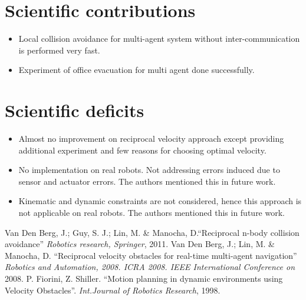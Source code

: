 \documentclass[12pt]{article}
\begin{document}
\section{Scientific contributions}
\begin{itemize}
    \item Local collision avoidance for multi-agent system without inter-communication is performed very fast.
    \item Experiment of office evacuation for multi agent done successfully.
\end{itemize}

\section{Scientific deficits}
\begin{itemize}
    \item Almost no improvement on reciprocal velocity approach\cite{van2008reciprocal} except providing additional experiment and few reasons for choosing optimal velocity.
    \item No implementation on real robots. Not addressing errors induced due to sensor and actuator errors. The authors mentioned this in future work.
    \item Kinematic and dynamic constraints are not considered, hence this approach is not applicable on real robots. The authors mentioned this in future work.
\end{itemize}

\begin{thebibliography}{1}
     Van Den Berg, J.; Guy, S. J.; Lin, M. \& Manocha, D.``Reciprocal n-body collision avoidance'' \textit{Robotics research, Springer}, 2011.
     Van Den Berg, J.; Lin, M. \& Manocha, D. ``Reciprocal velocity obstacles for real-time multi-agent navigation'' \textit{Robotics and Automation, 2008. ICRA 2008. IEEE International Conference on} 2008.
     P. Fiorini, Z. Shiller. ``Motion planning in dynamic environments using Velocity Obstacles''. \textit{Int.Journal of Robotics Research}, 1998.
\end{thebibliography}
\end{document}

